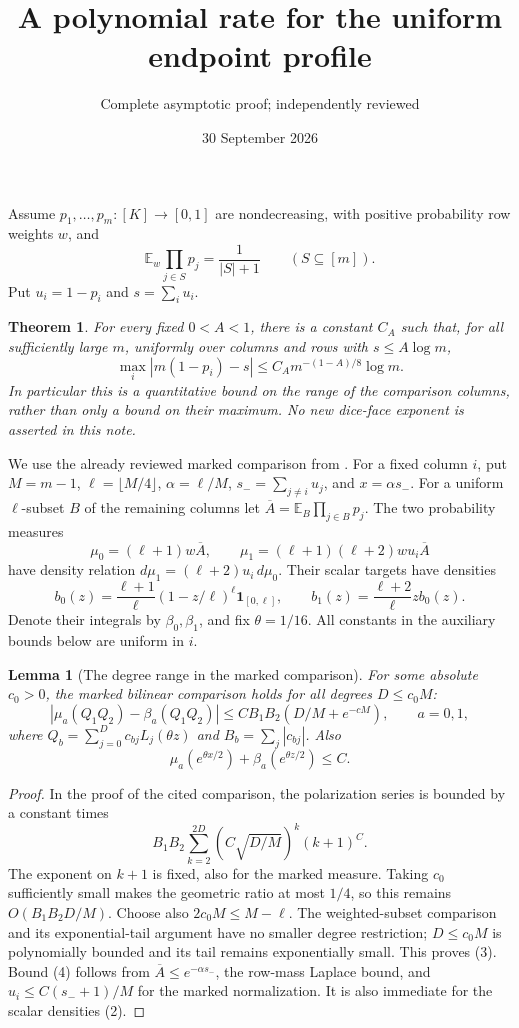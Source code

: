 \documentclass[11pt]{article}
\title{A polynomial rate for the uniform endpoint profile}
\author{Complete asymptotic proof; independently reviewed}
\date{30 September 2026}
\newtheorem{theorem}{Theorem}
\newtheorem{lemma}{Lemma}
\newcommand{\E}{\mathbb E}
\begin{document}
\maketitle
Assume $p_1,\ldots,p_m:[K]\to[0,1]$ are nondecreasing, with positive
probability row weights $w$, and
\[
 \E_w\prod_{j\in S}p_j=\frac1{|S|+1}\qquad(S\subseteq[m]).
\]
Put $u_i=1-p_i$ and $s=\sum_i u_i$.

\begin{theorem}\label{profile}
For every fixed $0<A<1$, there is a constant $C_A$ such that, for
all sufficiently large $m$, uniformly over columns and rows with
$s\le A\log m$,
\[
 \max_i|m(1-p_i)-s|
       \le C_A m^{-(1-A)/8}\log m.                 \tag{1}
\]
In particular this is a quantitative bound on the range of the
comparison columns, rather than only a bound on their maximum.
No new dice-face exponent is asserted in this note.
\end{theorem}

We use the already reviewed marked comparison from
. For a fixed
column $i$, put $M=m-1$, $\ell=\lfloor M/4\rfloor$,
$\alpha=\ell/M$, $s_-=\sum_{j\ne i}u_j$, and $x=\alpha s_-$.
For a uniform $\ell$-subset $B$ of the remaining columns let
$\overline A=\E_B\prod_{j\in B}p_j$. The two probability measures
\[
 \mu_0=(\ell+1)w\overline A,\qquad
 \mu_1=(\ell+1)(\ell+2)w u_i\overline A
\]
have density relation $d\mu_1=(\ell+2)u_i\,d\mu_0$.
Their scalar targets have densities
\[
 b_0(z)=\frac{\ell+1}{\ell}(1-z/\ell)^\ell\boldsymbol1_{[0,\ell]},
 \qquad b_1(z)=\frac{\ell+2}{\ell}z b_0(z).
 \tag{2}
\]
Denote their integrals by $\beta_0,\beta_1$, and fix $\theta=1/16$.
All constants in the auxiliary bounds below are uniform in $i$.

\begin{lemma}[The degree range in the marked comparison]\label{degree}
For some absolute $c_0>0$, the marked bilinear comparison holds for
all degrees $D\le c_0M$:
\[
 |\mu_a(Q_1Q_2)-\beta_a(Q_1Q_2)|
 \le C B_1B_2(D/M+e^{-cM}),\qquad a=0,1,          \tag{3}
\]
where $Q_b=\sum_{j=0}^D c_{bj}L_j(\theta z)$ and
$B_b=\sum_j|c_{bj}|$. Also
\[
 \mu_a(e^{\theta x/2})+\beta_a(e^{\theta z/2})\le C.
 \tag{4}
\]
\end{lemma}
\begin{proof}
In the proof of the cited comparison, the polarization series is
bounded by a constant times
\[
 B_1B_2\sum_{k=2}^{2D}(C\sqrt{D/M})^k(k+1)^C.
\]
The exponent on $k+1$ is fixed, also for the marked measure. Taking
$c_0$ sufficiently small makes the geometric ratio at most $1/4$,
so this remains $O(B_1B_2D/M)$. Choose also $2c_0M\le M-\ell$.
The weighted-subset comparison and its exponential-tail argument
have no smaller degree restriction; $D\le c_0M$ is polynomially
bounded and its tail remains exponentially small. This proves (3).
Bound (4) follows from $\overline A\le e^{-\alpha s_-}$, the row-mass
Laplace bound, and $u_i\le C(s_-+1)/M$ for the marked normalization.
It is also immediate for the scalar densities (2).
\end{proof}
\end{document}
